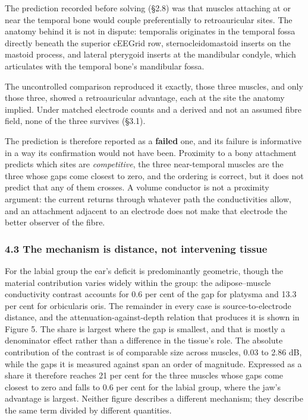 \documentclass[manuscript,review,anonymous]{acmart}
\newcounter{none}
\begin{document}
The prediction recorded before solving (\S{}2.8) was that muscles attaching at or
near the temporal bone would couple preferentially to retroauricular sites.
The anatomy behind it is not in dispute: temporalis originates in the temporal
fossa directly beneath the superior cEEGrid row, sternocleidomastoid inserts on
the mastoid process, and lateral pterygoid inserts at the mandibular condyle,
which articulates with the temporal bone's mandibular fossa.

The uncontrolled comparison reproduced it exactly, those three muscles, and only
those three, showed a retroauricular advantage, each at the site the anatomy
implied. Under matched electrode counts and a derived and not an assumed fibre
field, none of the three survives (\S{}3.1).

The prediction is therefore reported as a \textbf{failed} one, and its failure is
informative in a way its confirmation would not have been. Proximity to a bony
attachment predicts which sites are \emph{competitive}, the three near-temporal
muscles are the three whose gaps come closest to zero, and the ordering is
correct, but it does not predict that any of them crosses. A volume conductor is
not a proximity argument: the current returns through whatever path the
conductivities allow, and an attachment adjacent to an electrode does not make
that electrode the better observer of the fibre.

\subsubsection{4.3 The mechanism is distance, not intervening tissue}\label{the-mechanism-is-distance-not-intervening-tissue}

For the labial group the ear's deficit is predominantly geometric, though the
material contribution varies widely within the group: the adipose--muscle
conductivity contrast accounts for 0.6 per cent of the gap for platysma and
13.3 per cent for orbicularis oris. The remainder in every case is
source-to-electrode distance, and the attenuation-against-depth relation that
produces it is shown in Figure 5. The share is largest where the gap is
smallest, and that is mostly a denominator effect rather than a difference in
the tissue's role. The absolute contribution of the contrast is of comparable
size across muscles, 0.03 to 2.86 dB, while the gaps it is measured against
span an order of magnitude. Expressed as a share it therefore reaches 21 per
cent for the three muscles whose gaps come closest to zero and falls to 0.6
per cent for the labial group, where the jaw's advantage is largest. Neither
figure describes a different mechanism; they describe the same term divided by
different quantities.
\end{document}
